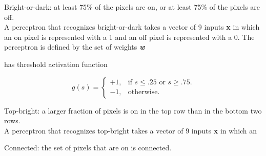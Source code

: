 \documentclass[solution, letterpaper]{cs121}
\begin{document}

\problem{} 

\subproblem Bright-or-dark: at least 75\% of the pixels are on, or at least 75\% of the pixels are off. \\

A perceptron that recognizes bright-or-dark takes a vector of 9 inputs {\bf x} in which an on pixel is represented with a 1 and an off pixel is represented with a 0. The perceptron is defined by the set of weights {\textbf{\emph{w}}}

has threshold activation function

\begin{equation}
  g(s)=\begin{cases}
    +1, & \text{if $s \leq .25$ or $s \geq .75$}.\\
    -1, & \text{otherwise}.
  \end{cases}
\end{equation}

\subproblem Top-bright: a larger fraction of pixels is on in the top row than in the bottom two rows. \\

A perceptron that recognizes top-bright takes a vector of 9 inputs {\bf x} in which an


\subproblem Connected: the set of pixels that are on is connected. \\




\problem{}

\problem{}

\problem{}
\end{document}
